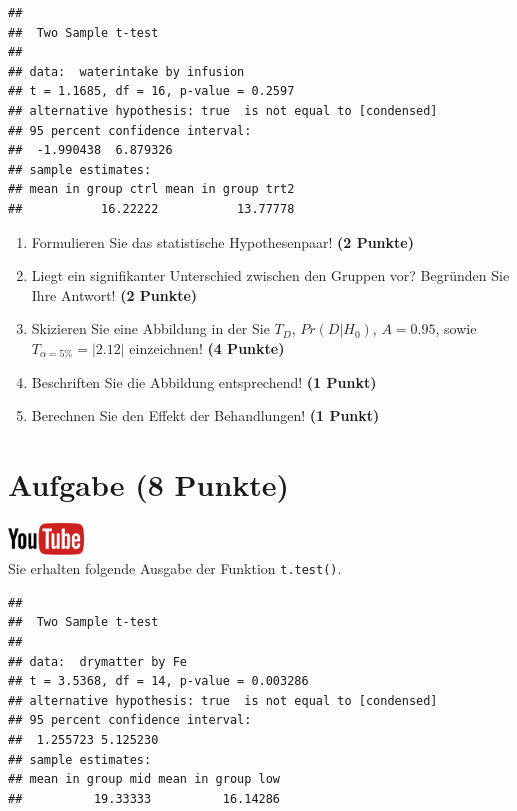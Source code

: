 \documentclass[a4paper, 9pt]{scrartcl}\usepackage[]{graphicx}\usepackage[]{xcolor}
\makeatletter
\newenvironment{kframe}{%
 \def\at@end@of@kframe{}%
 \ifinner\ifhmode%
  \def\at@end@of@kframe{\end{minipage}}%
  \begin{minipage}{\columnwidth}%
 \fi\fi%
 \def\FrameCommand##1{\hskip\@totalleftmargin \hskip-\fboxsep
 \colorbox{shadecolor}{##1}\hskip-\fboxsep
     \hskip-\linewidth \hskip-\@totalleftmargin \hskip\columnwidth}%
 \MakeFramed {\advance\hsize-\width
   \@totalleftmargin\z@ \linewidth\hsize
   \@setminipage}}%
 {\par\unskip\endMakeFramed%
 \at@end@of@kframe}
\newenvironment{knitrout}{}{} %
\makeatother
\begin{document}
\begin{knitrout}
\color{fgcolor}\begin{kframe}
\begin{verbatim}
## 
## 	Two Sample t-test
## 
## data:  waterintake by infusion
## t = 1.1685, df = 16, p-value = 0.2597
## alternative hypothesis: true  is not equal to [condensed]
## 95 percent confidence interval:
##  -1.990438  6.879326
## sample estimates:
## mean in group ctrl mean in group trt2 
##           16.22222           13.77778
\end{verbatim}
\end{kframe}
\end{knitrout}


\begin{enumerate}
  \item Formulieren Sie das statistische Hypothesenpaar! \textbf{(2
Punkte)}
\item Liegt ein signifikanter Unterschied zwischen den Gruppen vor?
  Begr{\"u}nden Sie Ihre Antwort! \textbf{(2 Punkte)}
\item Skizieren Sie eine Abbildung in der Sie $T_{D}$, $Pr(D|H_0)$, $A=0.95$,
  sowie $T_{\alpha=5\%} = |2.12|$ einzeichnen! \textbf{(4 Punkte)}
\item Beschriften Sie die Abbildung entsprechend! \textbf{(1 Punkt)}  
\item Berechnen Sie den Effekt der Behandlungen! \textbf{(1 Punkt)}
\end{enumerate} 
\clearpage

\section{Aufgabe \hfill (8 Punkte)}

\hfill\href{https://youtu.be/wJqsNV1hOW8}{\includegraphics[width =
  2cm]{img/youtube}}\\[1Ex]

Sie erhalten folgende \Rlogo Ausgabe der Funktion \texttt{t.test()}.

\begin{knitrout}
\color{fgcolor}\begin{kframe}
\begin{verbatim}
## 
## 	Two Sample t-test
## 
## data:  drymatter by Fe
## t = 3.5368, df = 14, p-value = 0.003286
## alternative hypothesis: true  is not equal to [condensed]
## 95 percent confidence interval:
##  1.255723 5.125230
## sample estimates:
## mean in group mid mean in group low 
##          19.33333          16.14286
\end{verbatim}
\end{kframe}
\end{knitrout}
\end{document}
